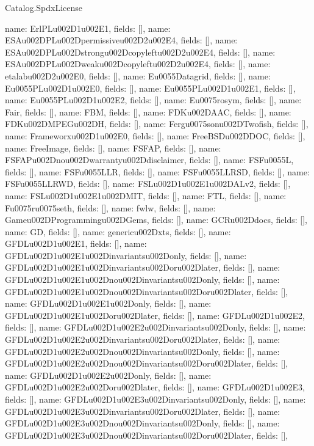 \begin{lexlean}{Catalog.SpdxLicense}
\begin{semanticmodule}
{    {name: ErlPLu002D1u002E1, fields: []},
    {name: ESAu002DPLu002Dpermissiveu002D2u002E4, fields: []},
    {name: ESAu002DPLu002Dstrongu002Dcopyleftu002D2u002E4, fields: []},
    {name: ESAu002DPLu002Dweaku002Dcopyleftu002D2u002E4, fields: []},
    {name: etalabu002D2u002E0, fields: []},
    {name: Eu0055Datagrid, fields: []},
    {name: Eu0055PLu002D1u002E0, fields: []},
    {name: Eu0055PLu002D1u002E1, fields: []},
    {name: Eu0055PLu002D1u002E2, fields: []},
    {name: Eu0075rosym, fields: []},
    {name: Fair, fields: []},
    {name: FBM, fields: []},
    {name: FDKu002DAAC, fields: []},
    {name: FDKu002DMPEGu002DH, fields: []},
    {name: Fergu0075sonu002DTwofish, fields: []},
    {name: Frameworxu002D1u002E0, fields: []},
    {name: FreeBSDu002DDOC, fields: []},
    {name: FreeImage, fields: []},
    {name: FSFAP, fields: []},
    {name: FSFAPu002Dnou002Dwarrantyu002Ddisclaimer, fields: []},
    {name: FSFu0055L, fields: []},
    {name: FSFu0055LLR, fields: []},
    {name: FSFu0055LLRSD, fields: []},
    {name: FSFu0055LLRWD, fields: []},
    {name: FSLu002D1u002E1u002DALv2, fields: []},
    {name: FSLu002D1u002E1u002DMIT, fields: []},
    {name: FTL, fields: []},
    {name: Fu0075ru0075seth, fields: []},
    {name: fwlw, fields: []},
    {name: Gameu002DProgrammingu002DGems, fields: []},
    {name: GCRu002Ddocs, fields: []},
    {name: GD, fields: []},
    {name: genericu002Dxts, fields: []},
    {name: GFDLu002D1u002E1, fields: []},
    {name: GFDLu002D1u002E1u002Dinvariantsu002Donly, fields: []},
    {name: GFDLu002D1u002E1u002Dinvariantsu002Doru002Dlater, fields: []},
    {name: GFDLu002D1u002E1u002Dnou002Dinvariantsu002Donly, fields: []},
    {name: GFDLu002D1u002E1u002Dnou002Dinvariantsu002Doru002Dlater, fields: []},
    {name: GFDLu002D1u002E1u002Donly, fields: []},
    {name: GFDLu002D1u002E1u002Doru002Dlater, fields: []},
    {name: GFDLu002D1u002E2, fields: []},
    {name: GFDLu002D1u002E2u002Dinvariantsu002Donly, fields: []},
    {name: GFDLu002D1u002E2u002Dinvariantsu002Doru002Dlater, fields: []},
    {name: GFDLu002D1u002E2u002Dnou002Dinvariantsu002Donly, fields: []},
    {name: GFDLu002D1u002E2u002Dnou002Dinvariantsu002Doru002Dlater, fields: []},
    {name: GFDLu002D1u002E2u002Donly, fields: []},
    {name: GFDLu002D1u002E2u002Doru002Dlater, fields: []},
    {name: GFDLu002D1u002E3, fields: []},
    {name: GFDLu002D1u002E3u002Dinvariantsu002Donly, fields: []},
    {name: GFDLu002D1u002E3u002Dinvariantsu002Doru002Dlater, fields: []},
    {name: GFDLu002D1u002E3u002Dnou002Dinvariantsu002Donly, fields: []},
    {name: GFDLu002D1u002E3u002Dnou002Dinvariantsu002Doru002Dlater, fields: []},
}
\end{semanticmodule}
\end{lexlean}
